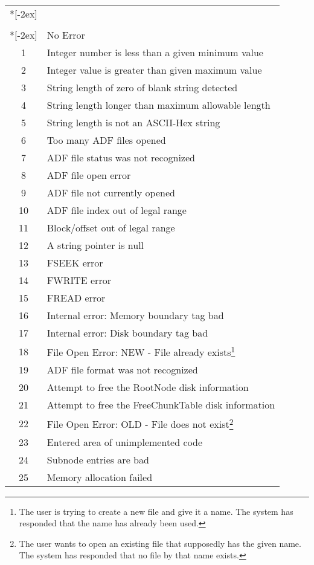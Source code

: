 \begin{longtable}{c >{\raggedright\arraybackslash}p{\Pwidth}}
\\*[-2ex]\hline
\multicolumn{2}{r}{\emph{Continued on next page}} \\
\endfoot
\\*[-2ex] \hline\hline
\endlastfoot
-1 & No Error \\
 1 & Integer number is less than a given minimum value \\
 2 & Integer value is greater than given maximum value \\
 3 & String length of zero of blank string detected \\
 4 & String length longer than maximum allowable length \\
 5 & String length is not an ASCII-Hex string \\
 6 & Too many ADF files opened \\
 7 & ADF file status was not recognized \\
 8 & ADF file open error \\
 9 & ADF file not currently opened \\
10 & ADF file index out of legal range \\
11 & Block/offset out of legal range \\
12 & A string pointer is null \\
13 & FSEEK error \\
14 & FWRITE error \\
15 & FREAD error \\
16 & Internal error: Memory boundary tag bad \\
17 & Internal error: Disk boundary tag bad \\
18 & File Open Error: NEW - File already exists\footnote{
     The user is trying to create a new file and give it a name.
     The system has responded that the name has already been used.} \\
19 & ADF file format was not recognized \\
20 & Attempt to free the RootNode disk information \\
21 & Attempt to free the FreeChunkTable disk information \\
22 & File Open Error: OLD - File does not exist\footnote{
     The user wants to open an existing file that supposedly has the
     given name.
     The system has responded that no file by that name exists.} \\
23 & Entered area of unimplemented code \\
24 & Subnode entries are bad \\
25 & Memory allocation failed \\

\end{longtable}
